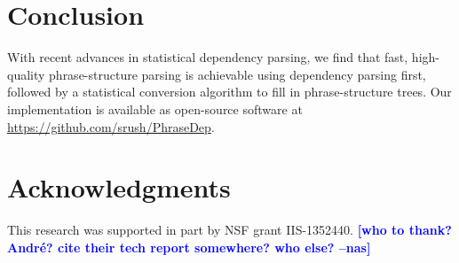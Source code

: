 \documentclass[11pt,letterpaper]{article}
\newcommand{\RuleA}[3]{#1 \rightarrow #2^*\ #3}
\newcommand{\RuleB}[3]{#1 \rightarrow #2\ #3^*}
\newcommand{\ParserUrl}{\url{https://github.com/srush/PhraseDep}}
\newcommand{\nascomment}[1]{\textcolor{blue}{\bf \small [#1 --nas]}}
\begin{document}



\section{Conclusion}

With recent advances in statistical dependency parsing, we find that
fast, high-quality phrase-structure parsing is achievable using dependency
parsing first, followed by a statistical conversion algorithm to
fill in phrase-structure trees. 
Our implementation is available as open-source software at \ParserUrl.

\section*{Acknowledgments}

This research was supported in part by NSF grant IIS-1352440.
\nascomment{who to thank?  Andr\'{e}?  cite their tech report
  somewhere?  who else?}










\end{document}
